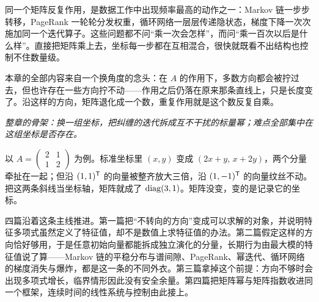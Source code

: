 同一个矩阵反复作用，是数据工作中出现频率最高的动作之一：Markov 链一步步转移，PageRank 一轮轮分发权重，循环网络一层层传递隐状态，梯度下降一次次施加同一个迭代算子。这些问题都不问``乘一次会怎样''，而问``乘一百次以后是什么样''。直接把矩阵乘上去，坐标每一步都在互相混合，很快就既看不出结构也控制不住数量级。

本章的全部内容来自一个换角度的念头：在 \(A\) 的作用下，多数方向都会被拧过去，但也许存在一些方向拧不动——作用之后仍落在原来那条直线上，只是长度变了。沿这样的方向，矩阵退化成一个数，重复作用就是这个数反复自乘。

\begin{center}

\emph{整章的骨架：换一组坐标，把纠缠的迭代拆成互不干扰的标量幂；难点全部集中在这组坐标是否存在。}
\end{center}

以 \(A=\begin{pmatrix}2&1\\1&2\end{pmatrix}\) 为例。标准坐标里 \((x,y)\) 变成 \((2x+y,\,x+2y)\)，两个分量牵扯在一起；但沿 \((1,1)^{\mathsf{T}}\) 的向量被整齐放大三倍，沿 \((1,-1)^{\mathsf{T}}\) 的向量纹丝不动。把这两条斜线当坐标轴，矩阵就成了 \(\operatorname{diag}(3,1)\)。矩阵没变，变的是记录它的坐标。

四篇沿着这条主线推进。第一篇把``不转向的方向''变成可以求解的对象，并说明特征多项式虽然定义了特征值，却不是数值上求特征值的办法。第二篇假定这样的方向恰好够用，于是任意初始向量都能拆成独立演化的分量，长期行为由最大模的特征值说了算——Markov 链的平稳分布与谱间隙、PageRank、幂迭代、循环网络的梯度消失与爆炸，都是这一条的不同外衣。第三篇拿掉这个前提：方向不够时会出现多项式增长，临界情形因此没有安全余量。第四篇把矩阵幂与矩阵指数收进同一个框架，连续时间的线性系统与控制由此接上。


